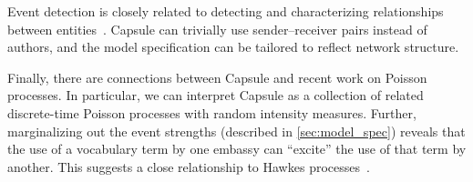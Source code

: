 Event detection is closely related to detecting and characterizing
relationships between
entities~\cite{schein2015bayesian,linderman2014discovering,das2011dynamic}. Capsule
can trivially use sender--receiver pairs instead of authors, and the
model specification can be tailored to reflect network structure.

Finally, there are connections between Capsule and recent work on
Poisson processes. In particular, we can interpret Capsule as a
collection of related discrete-time Poisson processes with random
intensity measures. Further, marginalizing out the event strengths
(described in \cref{sec:model_spec}) reveals that the use of a
vocabulary term by one embassy can ``excite'' the use of that term by
another. This suggests a close relationship to Hawkes
processes~\cite{hawkes1971spectra}.


